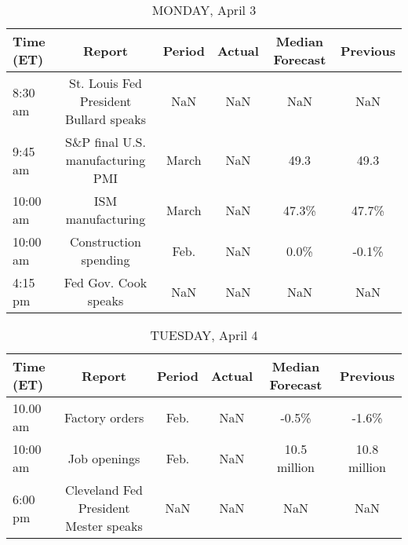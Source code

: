 \documentclass{article}%
\begin{document}
%
\normalsize%


\begin{table}[htbp]%
\caption{MONDAY, April 3}%
\centering%
\begin{adjustbox}{width=1\textwidth}%
\begin{tabular}{lccccc}
\toprule
Time (ET) &                                 Report & Period & Actual & Median Forecast & Previous \\
\midrule
  8:30 am & St. Louis Fed President Bullard speaks &    NaN &    NaN &             NaN &      NaN \\
  9:45 am &       S\&P final U.S. manufacturing PMI &  March &    NaN &            49.3 &     49.3 \\
 10:00 am &                      ISM manufacturing &  March &    NaN &           47.3\% &    47.7\% \\
 10:00 am &                  Construction spending &   Feb. &    NaN &            0.0\% &    -0.1\% \\
  4:15 pm &                   Fed Gov. Cook speaks &    NaN &    NaN &             NaN &      NaN \\
\bottomrule
\end{tabular}
%
\end{adjustbox}%
\end{table}

%


\begin{table}[htbp]%
\caption{TUESDAY, April 4}%
\centering%
\begin{adjustbox}{width=1\textwidth}%
\begin{tabular}{lccccc}
\toprule
Time (ET) &                                Report & Period & Actual & Median Forecast &     Previous \\
\midrule
 10.00 am &                        Factory orders &   Feb. &    NaN &           -0.5\% &        -1.6\% \\
 10:00 am &                          Job openings &   Feb. &    NaN &    10.5 million & 10.8 million \\
  6:00 pm & Cleveland Fed President Mester speaks &    NaN &    NaN &             NaN &          NaN \\
\bottomrule
\end{tabular}
%
\end{adjustbox}%
\end{table}

%
\end{document}
